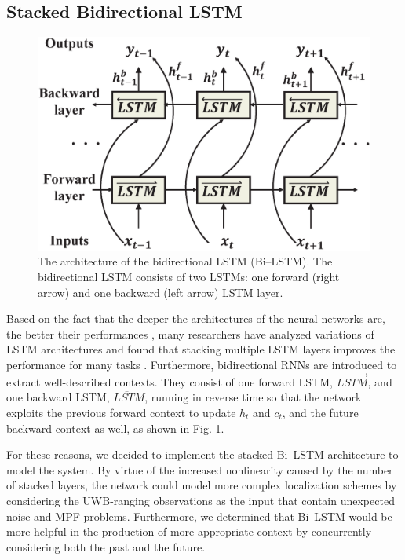 \documentclass[letterpaper, 10 pt, conference]{ieeeconf}
\begin{document}
\subsection{Stacked Bidirectional LSTM}

\begin{figure}[h!]
	\centering
	\includegraphics[width=.9\linewidth]{image/bidirectional_LSTM}
	\caption{The architecture of the bidirectional LSTM (Bi--LSTM). The bidirectional LSTM consists of two LSTMs: one forward (right arrow) and one backward (left arrow) LSTM layer.}
	
	\label{fig:bidirectional_revised}	
\end{figure}

Based on the fact that the deeper the architectures of the neural networks are, the better their performances \cite{simonyan2014very, he2016deep}, many researchers have analyzed variations of LSTM architectures and found that stacking multiple LSTM layers improves the performance for many tasks \cite{graves2013hybrid, graves2013speech, ullah2018action}. Furthermore, bidirectional RNNs are introduced \cite{schuster1997bidirectional} to extract well-described contexts. They consist of one forward LSTM, $\overrightarrow{LSTM}$, and one backward LSTM, $\overleftarrow{LSTM}$, running in reverse time so that the network exploits the previous forward context to update $h_{t}$ and $c_{t}$, and the future backward context as well, as shown in Fig. \ref{fig:bidirectional_revised}. 

For these reasons, we decided to implement the stacked Bi--LSTM architecture to model the system. By virtue of the increased nonlinearity caused by the number of stacked layers, the network could model more complex localization schemes by considering the UWB-ranging observations as the input that contain unexpected noise and MPF problems. Furthermore, we determined that Bi--LSTM would be more helpful in the production of more appropriate context by concurrently considering both the past and the future.
\end{document}
